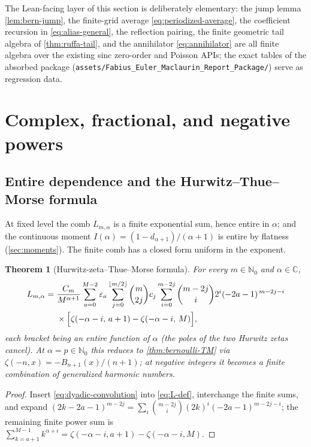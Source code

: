 \documentclass[11pt,oneside]{article}
\numberwithin{equation}{section}
\newtheorem{theorem}{Theorem}[section]
\theoremstyle{definition}
\theoremstyle{remark}
\newcommand{\C}{\mathbb C}
\newcommand{\N}{\mathbb N}
\newcommand{\eps}{\varepsilon}
\newcommand{\floor}[1]{\left\lfloor #1\right\rfloor}
\begin{document}
The Lean-facing layer of this section is deliberately elementary:
the jump lemma \cref{lem:bern-jump}, the finite-grid average
\eqref{eq:periodized-average}, the coefficient recursion in
\eqref{eq:alias-general}, the reflection pairing, the finite geometric
tail algebra of \cref{thm:ruffa-tail}, and the annihilator
\eqref{eq:annihilator} are all finite algebra over the existing sinc
zero-order and Poisson APIs; the exact tables of the absorbed package
(\nolinkurl{assets/Fabius_Euler_Maclaurin_Report_Package/}) serve as
regression data.


\section{Complex, fractional, and negative powers}
\label{sec:complex}

\subsection{Entire dependence and the Hurwitz--Thue--Morse formula}

At fixed level the comb $L_{m,\alpha}$ is a finite exponential sum,
hence entire in $\alpha$; and the continuous moment
$I(\alpha)=(1-d_{\alpha+1})/(\alpha+1)$ is entire by flatness
(\cref{sec:moments}).  The finite comb has a closed form uniform in
the exponent.

\begin{theorem}[Hurwitz-zeta--Thue--Morse formula]
\label{thm:Hurwitz-comb}
For every $m\in\N_0$ and $\alpha\in\C$,
\begin{equation}
\begin{split}
 L_{m,\alpha}
 ={}&\frac{C_m}{M^{\alpha+1}}
 \sum_{a=0}^{M-2}\eps_a
 \sum_{j=0}^{\floor{m/2}}\binom m{2j}c_j
 \sum_{i=0}^{m-2j}\binom{m-2j}{i}2^{i}(-2a-1)^{\,m-2j-i}\\
 &\times\Bigl[
 \zeta(-\alpha-i,\,a+1)-\zeta(-\alpha-i,\,M)
 \Bigr],
\end{split}
 \label{eq:Hurwitz-comb}
\end{equation}
each bracket being an entire function of $\alpha$ (the poles of the
two Hurwitz zetas cancel).  At $\alpha=p\in\N_0$ this reduces to
\cref{thm:bernoulli-TM} via $\zeta(-n,x)=-B_{n+1}(x)/(n+1)$; at
negative integers it becomes a finite combination of generalized
harmonic numbers.
\end{theorem}

\begin{proof}
Insert \eqref{eq:dyadic-convolution} into \eqref{eq:L-def},
interchange the finite sums, and expand
$(2k-2a-1)^{m-2j}
=\sum_i\binom{m-2j}i(2k)^{i}(-2a-1)^{m-2j-i}$; the remaining finite
power sum is
$\sum_{k=a+1}^{M-1}k^{\alpha+i}
=\zeta(-\alpha-i,a+1)-\zeta(-\alpha-i,M)$.
\end{proof}
\end{document}
